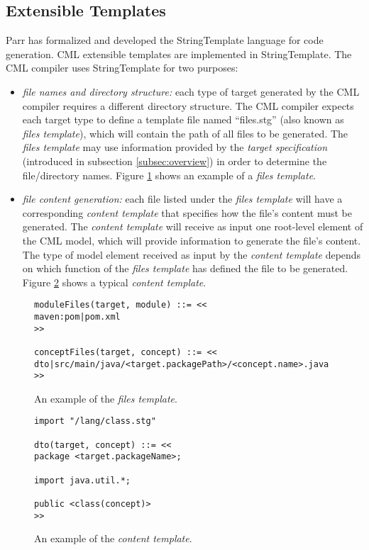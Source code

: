 \subsection{Extensible Templates}\label{subsec:templates}

Parr has formalized and developed the StringTemplate \cite{st} language for code generation. CML extensible templates are implemented in StringTemplate. The CML compiler uses StringTemplate for two purposes:

\begin{itemize}
\item \emph{file names and directory structure:}
each type of target generated by the CML compiler requires a different directory structure.
The CML compiler expects each target type to define a template file named ``files.stg'' (also known as \emph{files template}),
which will contain the path of all files to be generated. The \emph{files template} may use information provided by the \emph{target specification} (introduced in subsection \ref{subsec:overview}) in order to determine the file/directory names. Figure \ref{fig:template1} shows an example of a \emph{files template}.
\item \emph{file content generation:}
each file listed under the \emph{files template} will have a corresponding \emph{content template} that specifies how the file's content must be generated. The \emph{content template} will receive as input one root-level element of the CML model, which will provide information to generate the file's content. The type of model element received as input by the \emph{content template} depends on which function of the \emph{files template} has defined the file to be generated. Figure \ref{fig:template2} shows a typical \emph{content template}. 
\end{itemize}

\begin{figure}
\verbatimfont{\small}
\begin{verbatim}
moduleFiles(target, module) ::= <<
maven:pom|pom.xml
>>

conceptFiles(target, concept) ::= <<
dto|src/main/java/<target.packagePath>/<concept.name>.java
>>
\end{verbatim}
\caption{An example of the \emph{files template}.}
\label{fig:template1}
\end{figure}

\begin{figure}
\verbatimfont{\small}
\begin{verbatim}
import "/lang/class.stg"

dto(target, concept) ::= <<
package <target.packageName>;

import java.util.*;

public <class(concept)>
>>
\end{verbatim}
\caption{An example of the \emph{content template}.}
\label{fig:template2}
\end{figure}

